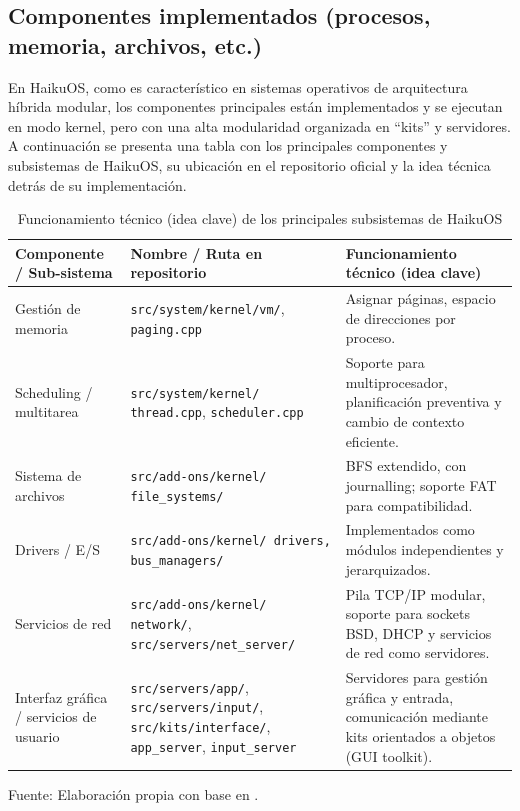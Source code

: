 \subsection{Componentes implementados (procesos, memoria, archivos, etc.)}
En HaikuOS, como es característico en sistemas operativos de arquitectura híbrida modular, los componentes principales están implementados y se ejecutan en modo kernel, pero con una alta modularidad organizada en “kits” y servidores.
A continuación se presenta una tabla con los principales componentes y subsistemas de HaikuOS, su ubicación en el repositorio oficial y la idea técnica detrás de su implementación.
\begin{table}[H]
\centering
\caption{Funcionamiento técnico (idea clave) de los principales subsistemas de HaikuOS}
\begin{tabular}{|p{3.5cm}|p{5cm}|p{6cm}|}
\hline
\textbf{Componente / Sub-sistema} & \textbf{Nombre / Ruta en repositorio} & \textbf{Funcionamiento técnico (idea clave)} \\ \hline
Gestión de memoria & \texttt{src/system/kernel/vm/}, \texttt{paging.cpp} & Asignar páginas, espacio de direcciones por proceso. \\ \hline
Scheduling / multitarea & \texttt{src/system/kernel/ thread.cpp}, \texttt{scheduler.cpp} & Soporte para multiprocesador, planificación preventiva y cambio de contexto eficiente. \\ \hline
Sistema de archivos & \texttt{src/add-ons/kernel/ file\_systems/} & BFS extendido, con journalling; soporte FAT para compatibilidad. \\ \hline
Drivers / E/S & \texttt{src/add-ons/kernel/ {drivers, bus\_managers}/} & Implementados como módulos independientes y jerarquizados. \\ \hline
Servicios de red & \texttt{src/add-ons/kernel/ network/}, \texttt{src/servers/net\_server/} & Pila TCP/IP modular, soporte para sockets BSD, DHCP y servicios de red como servidores. \\ \hline
Interfaz gráfica / servicios de usuario & \texttt{src/servers/app/}, \texttt{src/servers/input/}, \texttt{src/kits/interface/}, \texttt{app\_server}, \texttt{input\_server} & Servidores para gestión gráfica y entrada, comunicación mediante kits orientados a objetos (GUI toolkit). \\ \hline
\end{tabular}
\centering
Fuente: Elaboración propia con base en \citep{haiku_GitHub,2025deployment}.
\end{table}

